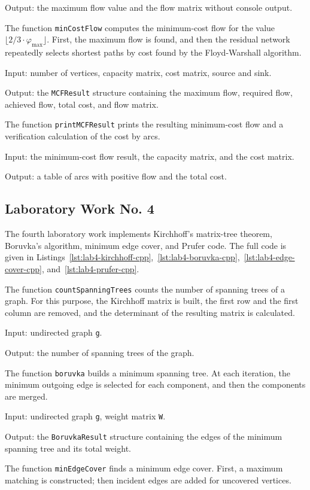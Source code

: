 \documentclass[a4paper,final]{article}
\begin{document}
Output: the maximum flow value and the flow matrix without console output.

The function \texttt{minCostFlow} computes the minimum-cost flow for the value $\lfloor 2/3 \cdot \varphi_{\max} \rfloor$. First, the maximum flow is found, and then the residual network repeatedly selects shortest paths by cost found by the Floyd-Warshall algorithm.

Input: number of vertices, capacity matrix, cost matrix, source and sink.

Output: the \texttt{MCFResult} structure containing the maximum flow, required flow, achieved flow, total cost, and flow matrix.

The function \texttt{printMCFResult} prints the resulting minimum-cost flow and a verification calculation of the cost by arcs.

Input: the minimum-cost flow result, the capacity matrix, and the cost matrix.

Output: a table of arcs with positive flow and the total cost.

\subsection{Laboratory Work No. 4}

The fourth laboratory work implements Kirchhoff's matrix-tree theorem, Boruvka's algorithm, minimum edge cover, and Prufer code. The full code is given in Listings~\ref{lst:lab4-kirchhoff-cpp},~\ref{lst:lab4-boruvka-cpp},~\ref{lst:lab4-edge-cover-cpp}, and~\ref{lst:lab4-prufer-cpp}.

The function \texttt{countSpanningTrees} counts the number of spanning trees of a graph. For this purpose, the Kirchhoff matrix is built, the first row and the first column are removed, and the determinant of the resulting matrix is calculated.

Input: undirected graph \texttt{g}.

Output: the number of spanning trees of the graph.

The function \texttt{boruvka} builds a minimum spanning tree. At each iteration, the minimum outgoing edge is selected for each component, and then the components are merged.

Input: undirected graph \texttt{g}, weight matrix \texttt{W}.

Output: the \texttt{BoruvkaResult} structure containing the edges of the minimum spanning tree and its total weight.

The function \texttt{minEdgeCover} finds a minimum edge cover. First, a maximum matching is constructed; then incident edges are added for uncovered vertices.
\end{document}
